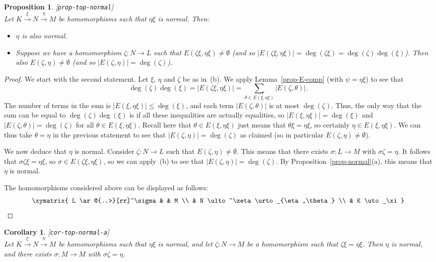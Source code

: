 \documentclass{amsart}
\newcommand{\lbl}[1]{\label{#1}\textup{[\texttt{#1}]}\ \\}
\newcommand{\lbl}{\label}
\newcommand{\zt}        {\zeta}
\newcommand{\tht}       {\theta}
\newcommand{\sg}        {\sigma}
\newcommand{\xra}       {\xrightarrow}
\renewcommand{\:}{\colon}
\newtheorem{proposition}[theorem]{Proposition}
\newtheorem{corollary}[theorem]{Corollary}
\theoremstyle{definition}
\begin{document}
\begin{proposition}\lbl{prop-top-normal}
 Let $K\xra{\xi}N\xra{\eta}M$ be homomorphisms such that $\eta\xi$ is
 normal.  Then:
 \begin{itemize}
  \item[(a)] $\eta$ is also normal.
  \item[(b)] Suppose we have a homomorphism $\zt\:N\to L$ such that
   $E(\zt\xi,\eta\xi)\neq\emptyset$ (and so
   $|E(\zt\xi,\eta\xi)|=\deg(\zt\xi)=\deg(\zt)\deg(\xi)$).  Then also
   $E(\zt,\eta)\neq\emptyset$ (and so $|E(\zt,\eta)|=\deg(\zt)$). 
 \end{itemize}
\end{proposition}
\begin{proof}
 We start with the second statement.  Let $\xi$, $\eta$ and $\zt$ be
 as in~(b).  We apply Lemma~\ref{prop-E-comp} (with $\psi=\eta\xi$) to
 see that 
 \[ \deg(\zt)\deg(\xi) = |E(\zt\xi,\eta\xi)| =
      \sum_{\tht\in E(\xi,\eta\xi)}|E(\zt,\tht)|.
 \]
 The number of terms in the sum is $|E(\xi,\eta\xi)|\leq\deg(\xi)$,
 and each term $|E(\zt,\tht)|$ is at most $\deg(\zt)$.  Thus, the only
 way that the sum can be equal to $\deg(\zt)\deg(\xi)$ is if all these
 inequalities are actually equalities, so $|E(\xi,\eta\xi)|=\deg(\xi)$
 and $|E(\zt,\tht)|=\deg(\zt)$ for all $\tht\in E(\xi,\eta\xi)$.
 Recall here that $\tht\in E(\xi,\eta\xi)$ just means that
 $\tht\xi=\eta\xi$, so certainly $\eta\in E(\xi,\eta\xi)$.  We can
 thus take $\tht=\eta$ in the previous statement to see that
 $|E(\zt,\eta)|=\deg(\zt)$ as claimed (so in particular
 $E(\zt,\eta)\neq\emptyset$). 

 We now deduce that $\eta$ is normal.  Consider $\zt\:N\to L$ such
 that $E(\zt,\eta)\neq\emptyset$.  This means that there exists
 $\sg\:L\to M$ with $\sg\zt=\eta$.  It follows that
 $\sg\zt\xi=\eta\xi$, so $\sg\in E(\zt\xi,\eta\xi)$, so we can
 apply~(b) to see that $|E(\zt,\eta)|=\deg(\zt)$.  By
 Proposition~\ref{prop-normal}(a), this means that $\eta$ is normal.

 The homomorphisms considered above can be displayed as follows:
 \[ \xymatrix{
     L \ar@{..>}[rr]^\sg & & M \\
     & N \ulto^\zt \urto_{\eta,\tht} \\
     & K \uto_\xi
    }
 \]
\end{proof}
\begin{corollary}\lbl{cor-top-normal-a}
 Let $K\xra{\xi}N\xra{\eta}M$ be homomorphisms such that $\eta\xi$ is
 normal, and let $\zt\:N\to M$ be a homomorphism such that
 $\zt\xi=\eta\xi$.  Then $\eta$ is normal, and there exists
 $\sg\:M\to M$ with $\sg\zt=\eta$.
\end{corollary}
\end{document}
